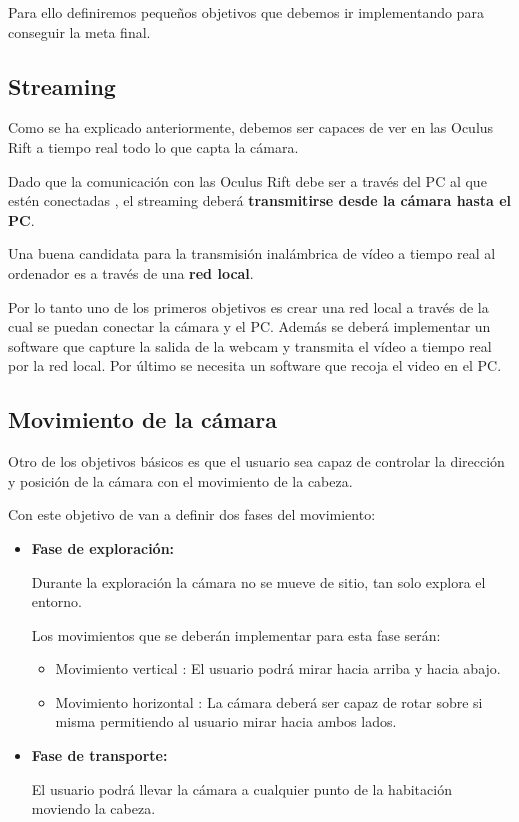 \documentclass[twoside, 12pt]{epstfg}
\begin{document}
Para ello definiremos pequeños objetivos que debemos ir implementando para conseguir la meta final.

\subsection{Streaming}
Como se ha explicado anteriormente, debemos ser capaces de ver en las Oculus Rift a tiempo real todo lo que capta la cámara.

Dado que la comunicación con las Oculus Rift debe ser a través del PC al que estén conectadas , el streaming deberá \textbf{transmitirse desde la cámara hasta el PC}.

Una buena candidata para la transmisión inalámbrica de vídeo a tiempo real al ordenador es a través de una \textbf{red local}.

Por lo tanto uno de los primeros objetivos es crear una red local a través de la cual se puedan conectar  la cámara y el PC. Además se deberá implementar un software que capture la salida de la webcam y transmita el vídeo a tiempo real por la red local. Por último se necesita un software que recoja el video en el PC.

\subsection{Movimiento de la cámara}
Otro de los objetivos básicos es que el usuario sea capaz de controlar la dirección y posición de la cámara con el movimiento de la cabeza.

Con este objetivo de van a definir dos fases del movimiento:
\begin{itemize}
	\item \textbf{Fase de exploración:}
	
	Durante la exploración la cámara no se mueve de sitio, tan solo explora el entorno.
	
	Los movimientos que se deberán implementar para esta fase serán:
	\begin{itemize}
		\item Movimiento vertical : El usuario podrá mirar hacia arriba y hacia abajo.
		\item Movimiento horizontal : La cámara deberá ser capaz de rotar sobre si misma permitiendo al usuario mirar hacia ambos lados.
	\end{itemize}
	\item \textbf{Fase de transporte:}
	
	El usuario podrá llevar la cámara a cualquier punto de la habitación moviendo la cabeza.
	
\end{itemize}
\end{document}
